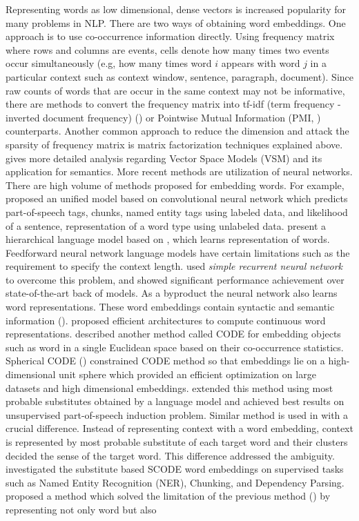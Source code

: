 Representing words as low dimensional, dense vectors is increased popularity for many problems in NLP. There are two ways of obtaining word embeddings. One approach is to use co-occurrence information directly. Using frequency matrix where rows and columns are events, cells denote how many times two events occur simultaneously (e.g, how many times word $i$ appears with word $j$ in a particular context such as context window, sentence, paragraph, document). Since raw counts of words that are occur in the same context may not be informative, there are methods to convert the frequency matrix into tf-idf (term frequency - inverted document frequency) (\cite{sparck1972statistical}) or Pointwise Mutual Information (PMI, \cite{church1990word}) counterparts. Another common approach to reduce the dimension and attack the sparsity of frequency matrix is matrix factorization techniques explained above. \cite{turney10frequency} gives more detailed analysis regarding Vector Space Models (VSM) and its application for semantics. More recent methods are utilization of neural networks. There are high volume of methods proposed for embedding words. For example, \cite{collobert2008unified} proposed an unified model based on convolutional neural network which predicts part-of-speech tags, chunks, named entity tags using labeled data, and likelihood of a sentence, representation of a word type using unlabeled data. \cite{mnih2009scalable} present a hierarchical language model based on \cite{morin2005hierarchical}, which learns representation of words. Feedforward neural network language models have certain limitations such as the requirement to specify the context length. \cite{mikolov2010recurrent} used \emph{simple recurrent neural network} to overcome this problem, and showed significant performance achievement over state-of-the-art back of models. As a byproduct the neural network also learns word representations. These word embeddings contain syntactic and semantic information (\cite{mikolov2013linguistic}). \cite{mikolov2013efficient} proposed efficient architectures to compute continuous word representations. \cite{globerson2004euclidean} described another method called CODE for embedding objects such as word in a single Euclidean space based on their co-occurrence statistics. Spherical CODE (\cite{Maron2010}) constrained CODE method so that embeddings lie on a high-dimensional unit sphere which provided an efficient optimization on large datasets and high dimensional embeddings. \cite{yatbaz2012learning} extended this method using most probable substitutes obtained by a language model and achieved best results on unsupervised part-of-speech induction problem. Similar method is used in \cite{baskaya13ai} with a crucial difference. Instead of representing context with a word embedding, context is represented by most probable substitute of each target word and their clusters decided the sense of the target word. This difference addressed the ambiguity. \cite{cirik2014substitute} investigated the substitute based SCODE word embeddings on supervised tasks such as Named Entity Recognition (NER), Chunking, and Dependency Parsing. \cite{yatbaz2014unsupervised} proposed a method which solved the limitation of the previous method (\cite{yatbaz2012learning}) by representing not only word but also 